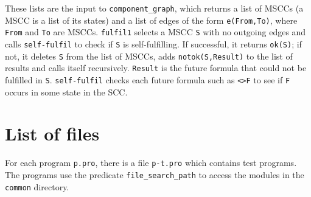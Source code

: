 \documentclass[11pt]{article}
\newcommand*{\p}[1]{\textup{\texttt{#1}}}
\begin{document}
These lists are the input to \p{component\_graph}, which returns a list
of MSCCs (a MSCC is a list of its states) and a list of edges of the
form \p{e(From,To)}, where \p{From} and \p{To} are MSCCs. \p{fulfil1}
selects a MSCC \p{S} with no outgoing edges and calls \p{self-fulfil} to
check if \p{S} is self-fulfilling. If successful, it returns \p{ok(S)};
if not, it deletes \p{S} from the list of MSCCs, adds
\p{notok(S,Result)} to the list of results and calls itself recursively.
\p{Result} is the future formula that could not be fulfilled in \p{S}.
\p{self-fulfil} checks each future formula such as \p{<>F} to see if
\p{F} occurs in some state in the SCC.


\newpage


\appendix
\section{List of files}\label{s.list}

For each program \p{p.pro}, there is a file \p{p-t.pro} which contains
test programs. The programs use the predicate \p{file\_search\_path} to
access the modules in the \p{common} directory.

\smallskip
\end{document}

